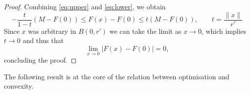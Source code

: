 \documentclass{report}
\begin{document}
\begin{proof}
		Combining \eqref{eq:upper} and \eqref{eq:lower}, we obtain 
		\begin{equation}
			- \frac{t}{1-t}(M-F(0)) \le F(x)-F(0) \le t(M-F(0)), \qquad t=\frac{\|x\|}{r'}
		\end{equation}
		Since $x$ was arbitrary in $B(0,r')$ we can take the limit as $x\to 0$, which implies $t\to 0$ and thus that 
		\begin{equation}
			\lim_{x\to 0}|F(x)-F(0)|=0,
		\end{equation}
		concluding the proof.
	\end{proof}

	The following result is at the core of the relation between optimisation and convexity.

\end{document}
